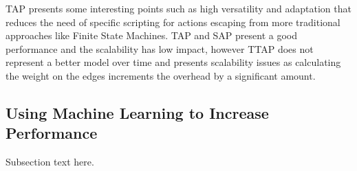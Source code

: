 \vspace{2mm}
TAP presents some interesting points such as high versatility and adaptation that reduces the need of specific scripting for actions escaping from more traditional approaches like Finite State Machines. TAP and SAP present a good performance and the scalability has low impact, however TTAP does not represent a better model over time and presents scalability issues as calculating the weight on the edges increments the overhead by a significant amount.


\subsection{Using Machine Learning to Increase Performance}
Subsection text here.
\vspace{2mm}